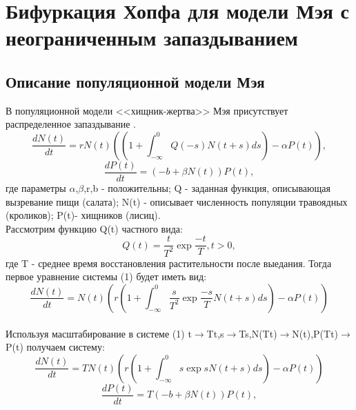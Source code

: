 \documentclass[12pt]{article}
\begin{document}
\newpage
\section{Бифуркация Хопфа для модели Мэя с неограниченным запаздыванием}
\subsection{Описание популяционной модели Мэя}
В популяционной модели <<хищник-жертва>> Мэя присутствует распределенное запаздывание  \cite{has}.
\begin{equation}
    \frac{d N(t)}{d t}=r N(t) \left( \left(1+ \int_{-\infty}^{0}Q(-s) N(t+s) d s \right)-\alpha P(t) \right), 
    \end{equation}
  \begin{equation*}
    \frac{d P(t)}{d t}=\left( -b + \beta N(t)\right) P(t),
\end{equation*}
где параметры $\alpha$,$\beta$,r,b - положительны; Q - заданная функция, описывающая вызревание пищи (салата); N(t) - описывает численность популяции травоядных (кроликов); P(t)- хищников (лисиц).\\
Рассмотрим функцию Q(t) частного вида:
\begin{equation*}
    Q(t)=\frac{t}{T^2}\exp{\frac{-t}{T}}, t>0 ,
\end{equation*}
где T - среднее время восстановления растительности после выедания. Тогда первое уравнение системы (1) будет иметь вид:
\begin{equation*}
     \frac{d N(t)}{d t}= N(t) \left(r \left(1+ \int_{-\infty}^{0}\frac{s}{T^2}\exp{\frac{-s}{T}} N(t+s) d s \right)-\alpha P(t) \right)
\end{equation*} \\
Используя масштабирование в системе (1) t$\to$Tt,s$\to$Ts,N(Tt)$\to$N(t),P(Tt)$\to$P(t) получаем систему:
\begin{equation}
     \frac{d N(t)}{d t}=T N(t) \left(r \left(1+ \int_{-\infty}^{0}s\exp{s} N(t+s) d s \right)-\alpha P(t) \right)
\end{equation}
\begin{equation*}
     \frac{d P(t)}{d t}=T\left( -b + \beta N(t)\right) P(t),
\end{equation*}
\newpage
\end{document}

